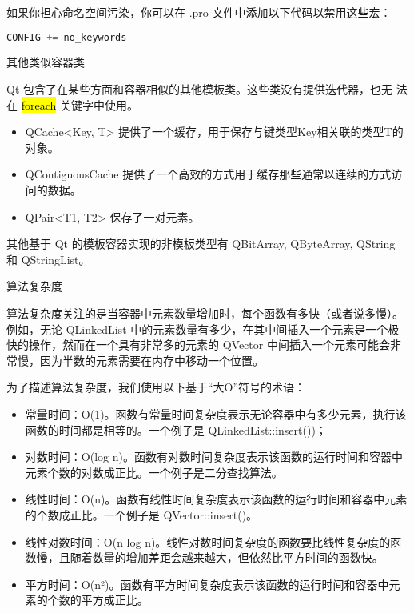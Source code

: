 如果你担心命名空间污染，你可以在 .pro 文件中添加以下代码以禁用这些宏：

\begin{lstlisting}[language=C++]
CONFIG += no_keywords
\end{lstlisting}

\splitLine

其他类似容器类

Qt 包含了在某些方面和容器相似的其他模板类。这些类没有提供迭代器，也无
法在 \hl{foreach} 关键字中使用。

\begin{itemize}
\item QCache<Key, T> 提供了一个缓存，用于保存与键类型Key相关联的类型T的对象。
\item QContiguousCache 提供了一个高效的方式用于缓存那些通常以连续的方式访问的数据。
\item QPair<T1, T2> 保存了一对元素。
\end{itemize}

其他基于 Qt 的模板容器实现的非模板类型有 QBitArray, QByteArray, QString 和 QStringList。

\splitLine

算法复杂度

算法复杂度关注的是当容器中元素数量增加时，每个函数有多快（或者说多慢）。例如，无论 QLinkedList 中的元素数量有多少，在其中间插入一个元素是一个极快的操作，然而在一个具有非常多的元素的 QVector 中间插入一个元素可能会非常慢，因为半数的元素需要在内存中移动一个位置。

为了描述算法复杂度，我们使用以下基于“大O”符号的术语：

\begin{itemize}
\item 常量时间：O(1)。函数有常量时间复杂度表示无论容器中有多少元素，执行该函数的时间都是相等的。一个例子是 QLinkedList::insert())；
\item 对数时间：O(log n)。函数有对数时间复杂度表示该函数的运行时间和容器中元素个数的对数成正比。一个例子是二分查找算法。
\item 线性时间：O(n)。函数有线性时间复杂度表示该函数的运行时间和容器中元素的个数成正比。一个例子是 QVector::insert()。
\item 线性对数时间：O(n log n)。线性对数时间复杂度的函数要比线性复杂度的函数慢，且随着数量的增加差距会越来越大，但依然比平方时间的函数快。
\item 平方时间：O(n²)。函数有平方时间复杂度表示该函数的运行时间和容器中元素的个数的平方成正比。
\end{itemize}

